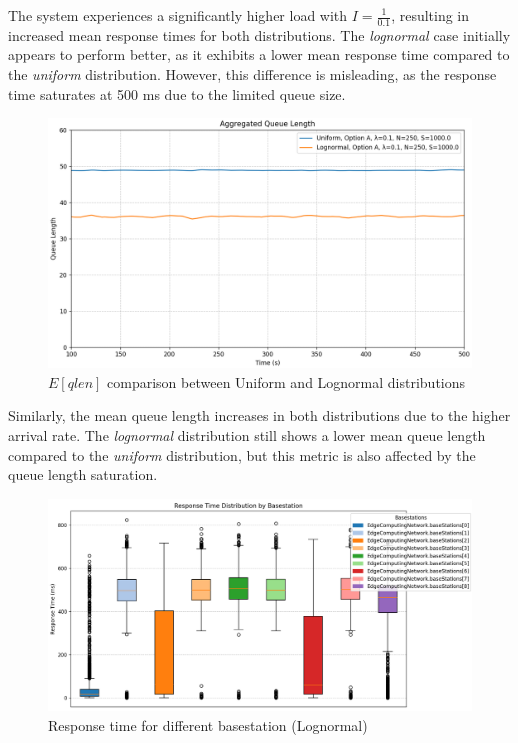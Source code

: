 \documentclass{report}
\begin{document}
The system experiences a significantly higher load with $I = \frac{1}{0.1}$, resulting in increased mean response times for both distributions. The \emph{lognormal} case initially appears to perform better, as it exhibits a lower mean response time compared to the \emph{uniform} distribution. 
However, this difference is misleading, as the response time saturates at 500 ms due to the limited queue size.

\begin{figure}[H]
    \centering
    \includegraphics[width=\textwidth]{img/plots/I-vary/Q_A_I01.png}
    \caption{$E[qlen]$ comparison between Uniform and Lognormal distributions}
\end{figure}

\begin{flushleft}
Similarly, the mean queue length increases in both distributions due to the higher arrival rate. The \emph{lognormal} distribution still shows a lower mean queue length compared to the \emph{uniform} distribution, but this metric is also affected by the queue length saturation.    
\end{flushleft}


\begin{figure}[H]
    \centering
    \includegraphics[width=\textwidth]{img/plots/I-vary/R_Box_Log_A_I01.png}
    \caption{Response time for different basestation (Lognormal)}
\end{figure}
\end{document}
